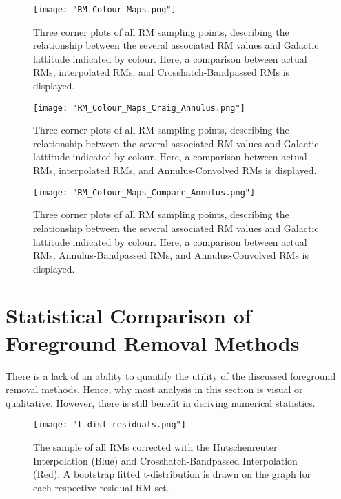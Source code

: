 \begin{figure}
    \texttt{[image: "RM\_Colour\_Maps.png"]}
    \centering
    \caption{Three corner plots of all RM sampling points, describing the relationship between the several associated RM values and Galactic lattitude indicated by colour. Here, a comparison between actual RMs, interpolated RMs, and Crosshatch-Bandpassed RMs is displayed.}
    \label{fig:colour_maps_1}
\end{figure}

\begin{figure}
    \texttt{[image: "RM\_Colour\_Maps\_Craig\_Annulus.png"]}
    \centering
    \caption{Three corner plots of all RM sampling points, describing the relationship between the several associated RM values and Galactic lattitude indicated by colour. Here, a comparison between actual RMs, interpolated RMs, and Annulus-Convolved RMs is displayed.}
    \label{fig:colour_maps_2}
\end{figure}

\begin{figure}
    \texttt{[image: "RM\_Colour\_Maps\_Compare\_Annulus.png"]}
    \centering
    \caption{Three corner plots of all RM sampling points, describing the relationship between the several associated RM values and Galactic lattitude indicated by colour. Here, a comparison between actual RMs, Annulus-Bandpassed RMs, and Annulus-Convolved RMs is displayed.}
    \label{fig:colour_maps_3}
\end{figure}


\section{Statistical Comparison of Foreground Removal Methods}
\label{sec:FR_stats}

There is a lack of an ability to quantify the utility of the discussed foreground removal methods. Hence, why most analysis in this section is visual or qualitative. However, there is still benefit in deriving numerical statistics.

\begin{figure}
    \texttt{[image: "t\_dist\_residuals.png"]}
    \centering
    \caption{The sample of all RMs corrected with the Hutschenreuter Interpolation (Blue) and Crosshatch-Bandpassed Interpolation (Red). A bootstrap fitted t-distribution is drawn on the graph for each respective residual RM set.}
    \label{fig:t_dist}
\end{figure}

